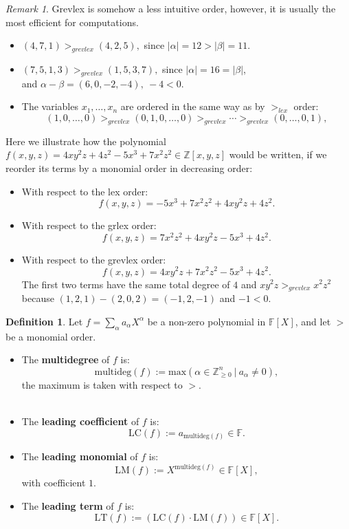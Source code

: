 \documentclass[thesis=M,english]{FITthesis}[2012/10/20]
\theoremstyle{remark}
\newtheorem*{RM}{Remark}
\theoremstyle{definition}
\newtheorem{DF}{Definition}[section]
\begin{document}
\begin{RM}
Grevlex is somehow a less intuitive order, however, it is usually the most efficient for computations.
\end{RM}
\begin{itemize}
\item $(4,7,1) >_{grevlex} (4, 2,5),$ since $|\alpha| = 12 > |\beta| = 11$.
\item $  (7, 5, 1, 3) >_{grevlex} (1,5,3,7),$ since $|\alpha| = 16 = |\beta|$, \\
and $\alpha - \beta = (6,0,-2, -4),\ -4 < 0$.
\item The variables $x_1,\ldots,x_n$ are ordered in the same way as by $>_{lex}$ order:
$$
(1,0,\ldots,0) >_{grevlex} (0,1,0,\ldots, 0) >_{grevlex} \cdots >_{grevlex} (0, \ldots, 0, 1),
$$
\end{itemize}
Here we illustrate how the polynomial $f(x,y,z) = 4xy^2z + 4z^2 - 5x^3 + 7x^2z^2 \in \mathbb{Z}[x,y,z]$ would be written, if we reorder its terms by a monomial order in decreasing order:
\begin{itemize}
\item With respect to the lex order:
$$
f(x,y,z) = -5x^3 + 7x^2z^2 + 4xy^2z + 4z^2.
$$
\item With respect to the grlex order:
$$
f(x,y,z) = 7x^2z^2  + 4xy^2z -5x^3 + 4z^2.
$$
\item With respect to the grevlex order:
$$
f(x,y,z) = 4xy^2z + 7x^2z^2  -5x^3 + 4z^2.
$$
The first two terms have the same total degree of $4$ and $xy^2z >_{grevlex} x^2z^2$ because $(1,2,1) - (2,0,2) = (-1,2,-1)$ and $-1 < 0$.
\end{itemize} 
\begin{DF}
Let $f = \sum_\alpha a_\alpha X^\alpha$ be a non-zero polynomial in $\mathbb{F}[X]$, and let $>$ be a monomial order.
\begin{itemize}
\item The \textbf{multidegree} of $f$ is:
$$
\text{multideg}(f) := \text{max}(\alpha \in \mathbb{Z}_{\geq 0}^n\ |\ a_\alpha \neq 0),
$$
the maximum is taken with respect to $>$.\\ \\
\item The \textbf{leading coefficient} of $f$ is:
$$
\text{LC}(f) := a_{\text{multideg}(f)} \in \mathbb{F}.
$$
\item The \textbf{leading monomial} of $f$ is:
$$
\text{LM}(f) := X^{\text{multideg}(f)} \in \mathbb{F}[X],
$$
with coefficient $1$.
\item The \textbf{leading term} of $f$ is:
$$
\text{LT}(f) := (\text{LC}(f)\cdot \text{LM}(f)) \in \mathbb{F}[X].
$$
\end{itemize}
\end{DF}
\end{document}
